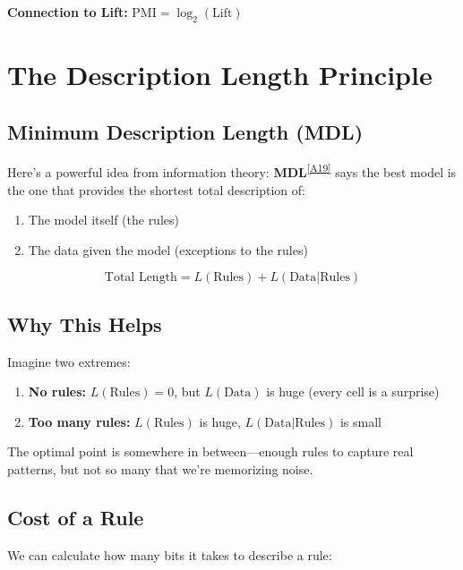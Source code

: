 \documentclass[11pt,a4paper]{article}
\newcommand{\term}[2]{\textcolor{termcolor}{\textbf{#1}}\textsuperscript{\hyperref[#2]{[#2]}}}
\begin{document}
\textbf{Connection to Lift:} $\text{PMI} = \log_2(\text{Lift})$

\section{The Description Length Principle}

\subsection{Minimum Description Length (MDL)}

Here's a powerful idea from information theory: \term{MDL}{A19} says the best model is the one that provides the shortest total description of:
\begin{enumerate}
    \item The model itself (the rules)
    \item The data given the model (exceptions to the rules)
\end{enumerate}

\begin{equation}
\text{Total Length} = L(\text{Rules}) + L(\text{Data} | \text{Rules})
\end{equation}

\subsection{Why This Helps}

Imagine two extremes:
\begin{enumerate}
    \item \textbf{No rules:} $L(\text{Rules}) = 0$, but $L(\text{Data})$ is huge (every cell is a surprise)
    \item \textbf{Too many rules:} $L(\text{Rules})$ is huge, $L(\text{Data}|\text{Rules})$ is small
\end{enumerate}

The optimal point is somewhere in between---enough rules to capture real patterns, but not so many that we're memorizing noise.

\subsection{Cost of a Rule}

We can calculate how many bits it takes to describe a rule:
\end{document}

